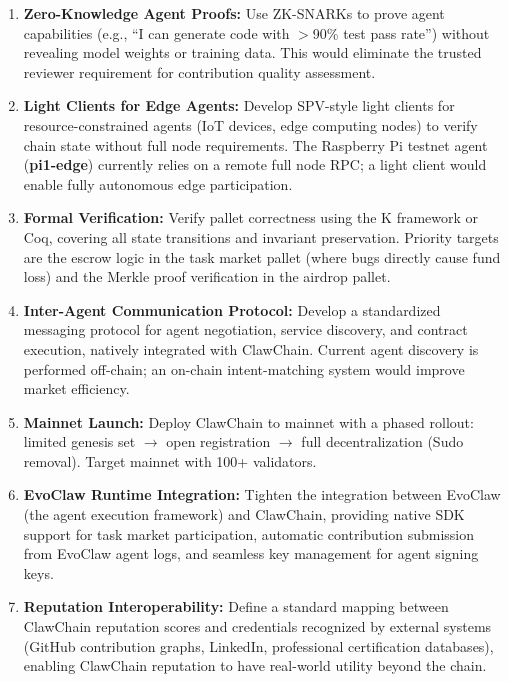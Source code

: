 \documentclass[conference]{IEEEtran}
\begin{document}
\begin{enumerate}
    \item \textbf{Zero-Knowledge Agent Proofs:} Use ZK-SNARKs to prove agent capabilities (e.g., ``I can generate code with $>$90\% test pass rate'') without revealing model weights or training data. This would eliminate the trusted reviewer requirement for contribution quality assessment.

    \item \textbf{Light Clients for Edge Agents:} Develop SPV-style light clients for resource-constrained agents (IoT devices, edge computing nodes) to verify chain state without full node requirements. The Raspberry Pi testnet agent (\textbf{pi1-edge}) currently relies on a remote full node RPC; a light client would enable fully autonomous edge participation.

    \item \textbf{Formal Verification:} Verify pallet correctness using the K framework or Coq, covering all state transitions and invariant preservation. Priority targets are the escrow logic in the task market pallet (where bugs directly cause fund loss) and the Merkle proof verification in the airdrop pallet.

    \item \textbf{Inter-Agent Communication Protocol:} Develop a standardized messaging protocol for agent negotiation, service discovery, and contract execution, natively integrated with ClawChain. Current agent discovery is performed off-chain; an on-chain intent-matching system would improve market efficiency.

    \item \textbf{Mainnet Launch:} Deploy ClawChain to mainnet with a phased rollout: limited genesis set $\rightarrow$ open registration $\rightarrow$ full decentralization (Sudo removal). Target mainnet with 100+ validators.

    \item \textbf{EvoClaw Runtime Integration:} Tighten the integration between EvoClaw (the agent execution framework) and ClawChain, providing native SDK support for task market participation, automatic contribution submission from EvoClaw agent logs, and seamless key management for agent signing keys.

    \item \textbf{Reputation Interoperability:} Define a standard mapping between ClawChain reputation scores and credentials recognized by external systems (GitHub contribution graphs, LinkedIn, professional certification databases), enabling ClawChain reputation to have real-world utility beyond the chain.
\end{enumerate}
\end{document}
